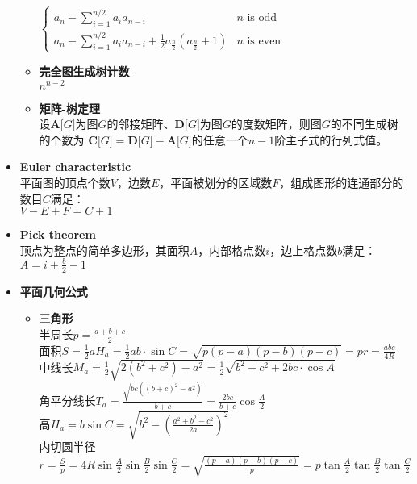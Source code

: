 \begin{itemize}
\begin{itemize}
                \\$ \begin{cases}
                    a_n - \sum\limits_{i = 1}^{n / 2} a_i a_{n - i} & n \text{ is odd}\\
                    a_n - \sum\limits_{i = 1}^{n / 2} a_i a_{n - i} + \frac{1}{2} a_{\frac{n}{2}} (a_{\frac{n}{2}} + 1) & n \text{ is even}
                \end{cases} $
            \item \textbf{完全图生成树计数}
                \\$ n^{n - 2} $
            \item \textbf{矩阵-树定理}
                \\设$ \mathbf{A}\lbrack G \rbrack $为图$ G $的邻接矩阵、$ \mathbf{D}\lbrack G \rbrack $为图$ G $的度数矩阵，则图$ G $的不同生成树的个数为 $ \mathbf{C}\lbrack G \rbrack = \mathbf{D}\lbrack G \rbrack - \mathbf{A}\lbrack G \rbrack $的任意一个$ n - 1 $阶主子式的行列式值。
        \end{itemize}
    \item \textbf{Euler characteristic}
        \\ 平面图的顶点个数$ V $，边数$ E $，平面被划分的区域数$ F $，组成图形的连通部分的数目$ C $满足：
        \\$ V - E + F = C + 1 $
    \item \textbf{Pick theorem}
        \\顶点为整点的简单多边形，其面积$ A $，内部格点数$ i $，边上格点数$ b $满足：
        \\$ A = i + \frac{b}{2} - 1 $
    \item \textbf{平面几何公式}
        \begin{itemize}
            \item \textbf{三角形}
                \\半周长$ p = \frac{a + b + c}{2} $
                \\面积$ S = \frac{1}{2} a H_a = \frac{1}{2} a b \cdot \sin C = \sqrt{p(p - a)(p - b)(p - c)} = p r = \frac{a b c}{4R} $
                \\中线长$ M_a = \frac{1}{2} \sqrt{2(b^2 + c^2) - a^2} = \frac{1}{2} \sqrt{b^2 + c^2 + 2 b c \cdot \cos A} $
                \\角平分线长$ T_a = \frac{\sqrt{bc((b + c)^2 - a^2)}}{b + c} = \frac{2 b c}{b + c} \cos \frac{A}{2} $
                \\高$ H_a = b \sin C = \sqrt{b^2 - (\frac{a^2 + b^2 - c^2}{2 a})^2} $
                \\内切圆半径$ r = \frac{S}{p} = 4 R \sin \frac{A}{2} \sin \frac{B}{2} \sin \frac{C}{2} = \sqrt{\frac{(p - a)(p - b)(p - c)}{p}} = p \tan \frac{A}{2} \tan \frac{B}{2} \tan \frac{C}{2} $

\end{itemize}
\end{itemize}
